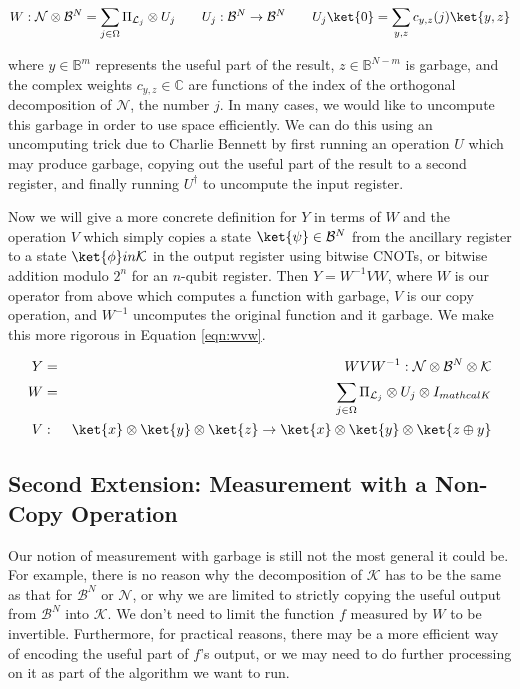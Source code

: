 \documentclass{article}
\theoremstyle{definition} \newtheorem{lemma}{Lemma}
\theoremstyle{definition} \newtheorem{theorem}{Theorem}
\begin{document}
\begin{equation}
W: \mathcal{N} \otimes \mathcal{B}^N =
\sum_{j \in \Omega} \Pi_{\mathcal{L}_j} \otimes U_j \qquad
U_j : \mathcal{B}^N \rightarrow \mathcal{B}^N \qquad
U_j\ket{0} = \sum_{y,z} c_{y,z}(j)\ket{y,z}
\end{equation}

where $y \in \mathbb{B}^m$ represents the useful part of the result,
$z \in \mathbb{B}^{N-m}$ is garbage, and the complex weights
$c_{y,z} \in \mathbb{C}$
are functions of the index of the orthogonal decomposition of $\mathcal{N}$,
the number $j$. In many cases, we would like to uncompute this garbage in
order to use space efficiently.
We can do this using an uncomputing trick due to Charlie Bennett
\cite{Bennett1973} by first running an operation $U$ which may produce
garbage, copying out the useful part of the result to a
second register, and finally running $U^{\dagger}$ to uncompute the
input register.

Now we will give a more concrete definition for $Y$ in terms of
$W$ and the operation $V$ which simply copies a state $\ket{\psi} \in \mathcal{B}^N$
from the ancillary register to a state $\ket{\phi} in \mathcal{K}$ in the
output register using bitwise CNOTs, or bitwise addition modulo $2^n$ for an
$n$-qubit register. Then $Y = W^{-1}VW$, where $W$ is our operator from above
which computes a function with garbage, $V$ is our copy operation, and
$W^{-1}$ uncomputes the original function and it garbage. We make this
more rigorous in Equation \ref{eqn:wvw}.

\begin{eqnarray}
Y & = & WVW^{-1} : \mathcal{N} \otimes \mathcal{B}^N \otimes \mathcal{K} \\
W & = &
\sum_{j \in \Omega} \Pi_{\mathcal{L}_j} \otimes U_j \otimes I_{mathcal{K}}\\
V & : & \ket{x} \otimes \ket{y} \otimes \ket{z} \rightarrow \ket{x} \otimes \ket{y} \otimes \ket{z \oplus y}
\label{eqn:wvw}
\end{eqnarray}

\subsection{Second Extension: Measurement with a Non-Copy Operation}
\label{subsec:non-copy}

Our notion of measurement with garbage is still not the most general it could be.
For example, there is no reason why the decomposition of $\mathcal{K}$ has to
be the same as that for $\mathcal{B}^N$ or $\mathcal{N}$, or why we are limited
to strictly copying the useful output from $\mathcal{B}^N$ into $\mathcal{K}$.
We don't need to limit the function $f$ measured by $W$ to be invertible.
Furthermore, for practical reasons, there may be a more efficient way of encoding
the useful part of $f$'s output, or we may need to do further processing on it
as part of the algorithm we want to run.
\end{document}
